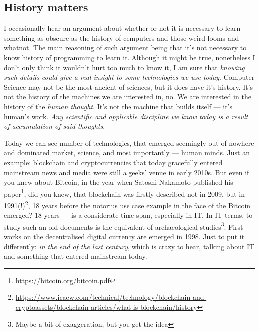 \documentclass[../../what-is-computer]{subfiles}
\begin{document}
    \subsection{History matters}\label{subsection:history-matters}

    I occasionally hear an argument about whether or not it is necessary to learn something as obscure as the history of computers and those weird looms and whatnot. The main
    reasoning of such argument being that it's not necessary to know history of programming to learn it. Although it might be true, nonetheless I don't only think it 
    wouldn't hurt too much to know it, I am sure that \emph{knowing such details could give a real insight to some technologies we use today}. Computer Science
    may not be the most ancient of sciences, but it does have it's history. It's not the history of the machines we are interested in, no. We are interested in 
    the history of the \emph{human thought}. It's not the machine that builds itself --- it's human's work. \emph{Any scientific and applicable discipline we know today
    is a result of accumulation of said thoughts}. \par

    Today we can see number of technologies, that emerged seemingly out of nowhere and dominated market, science, and 
    most importantly --- human minds. Just an example: blockchain and cryptocurrencies that today gracefully entered mainstream news and media were still a geeks'
    venue in early 2010s. But even if you knew about Bitcoin, in the year when Satoshi Nakamoto published his paper\footnote{\href{https://bitcoin.org/bitcoin.pdf}
    {https://bitcoin.org/bitcoin.pdf}}, did you knew, that blockchain was firstly described not in 2009, but in 
    1991(!)\footnote{\href{https://www.icaew.com/technical/technology/blockchain-and-cryptoassets/blockchain-articles/what-is-blockchain/history}
    {https://www.icaew.com/technical/technology/blockchain-and-cryptoassets/blockchain-articles/what-is-blockchain/history}}, 18 years before the notorius use case example
    in the face of the Bitcoin emerged? 18 years --- is a considerate time-span, especially in IT. In IT terms, to study such an old documents is the equivalent of
    archaeological studies\footnote{Maybe a bit of exaggeration, but you get the idea}. First works on the decentralised digital currency are emerged in 1998. Just to
    put it differently: \emph{in the end of the last century}, which is crazy to hear, talking about IT and something that entered mainstream today. \par
\end{document}
